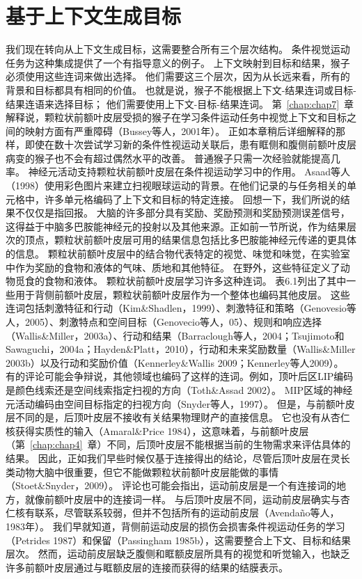 \section{基于上下文生成目标}

我们现在转向从上下文生成目标，这需要整合所有三个层次结构。
条件视觉运动任务为这种集成提供了一个有指导意义的例子。
上下文映射到目标和结果，猴子必须使用这些连词来做出选择。
他们需要这三个层次，因为从长远来看，所有的背景和目标都具有相同的价值。
也就是说，猴子不能根据上下文-结果连词或目标-结果连语来选择目标；
他们需要使用上下文-目标-结果连词。
第~\ref{chap:chap7}~章解释说，颗粒状前额叶皮层受损的猴子在学习条件运动任务中视觉上下文和目标之间的映射方面有严重障碍（Bussey等人，2001年）。
正如本章稍后详细解释的那样，即使在数十次尝试学习新的条件性视运动关联后，患有眶侧和腹侧前额叶皮层病变的猴子也不会有超过偶然水平的改善。
普通猴子只需一次经验就能提高几率。
神经元活动支持颗粒状前额叶皮层在条件视运动学习中的作用。
Asaad等人（1998）使用彩色图片来建立扫视眼球运动的背景。在他们记录的与任务相关的单元格中，许多单元格编码了上下文和目标的特定连接。
回想一下，我们所说的结果不仅仅是指回报。
大脑的许多部分具有奖励、奖励预测和奖励预测误差信号，这得益于中脑多巴胺能神经元的投射以及其他来源。正如前一节所说，作为结果层次的顶点，颗粒状前额叶皮层可用的结果信息包括比多巴胺能神经元传递的更具体的信息。
颗粒状前额叶皮层中的结合物代表特定的视觉、味觉和味觉，在实验室中作为奖励的食物和液体的气味、质地和其他特征。
在野外，这些特征定义了动物觅食的食物和液体。
颗粒状前额叶皮层学习许多这种连词。
表6.1列出了其中一些用于背侧前额叶皮层，颗粒状前额叶皮层作为一个整体也编码其他皮层。
这些连词包括刺激特征和行动（Kim\&Shadlen，1999）、刺激特征和策略（Genovesio等人，2005）、刺激特点和空间目标（Genovecio等人，05）、规则和响应选择（Wallis\&Miller，2003a）、行动和结果（Barraclough等人，2004；Tsujimoto和Sawaguchi，2004a；Hayden\&Platt，2010），行动和未来奖励数量（Wallis\&Miller 2003b）以及行动和奖励价值（Kennerley\&Wallis 2009；Kennerley等人2009）。
有的评论可能会争辩说，其他领域也编码了这样的连词。例如，顶叶后区LIP编码是颜色线索还是空间线索指定扫视的方向（Toth\&Assad 2002）。
MIP区域的神经元活动编码由空间目标指定的扫视方向（Snyder等人，1997）。
但是，与前额叶皮层不同的是，后顶叶皮层不接收有关结果物理财产的直接信息。
它也没有从杏仁核获得实质性的输入（Amaral\&Price 1984），这意味着，与前额叶皮层（第~\ref{chap:chap4}~章）不同，后顶叶皮层不能根据当前的生物需求来评估具体的结果。
因此，正如我们早些时候仅基于连接得出的结论，尽管后顶叶皮层在灵长类动物大脑中很重要，但它不能做颗粒状前额叶皮层能做的事情（Stoet\&Snyder，2009）。
评论也可能会指出，运动前皮层是一个有连接词的地方，就像前额叶皮层中的连接词一样。
与后顶叶皮层不同，运动前皮层确实与杏仁核有联系，尽管联系较弱，但并不包括所有的运动前皮层（Avendaño等人，1983年）。
我们早就知道，背侧前运动皮层的损伤会损害条件视运动任务的学习（Petrides 1987）和保留（Passingham 1985b），这需要整合上下文、目标和结果层次。
然而，运动前皮层缺乏腹侧和眶额皮层所具有的视觉和听觉输入，也缺乏许多前额叶皮层通过与眶额皮层的连接而获得的结果的结膜表示。


